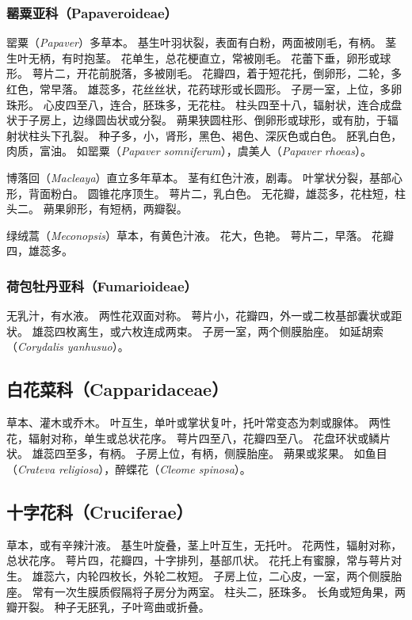 \documentclass[11pt]{article}
\begin{document}
\begin{sloppypar}
\subsubsection{罂粟亚科（Papaveroideae）}
罂粟（\textit{Papaver}）多草本。
基生叶羽状裂，表面有白粉，两面被刚毛，有柄。
茎生叶无柄，有时抱茎。
花单生，总花梗直立，常被刚毛。
花蕾下垂，卵形或球形。
萼片二，开花前脱落，多被刚毛。
花瓣四，着于短花托，倒卵形，二轮，多红色，常早落。
雄蕊多，花丝丝状，花药球形或长圆形。
子房一室，上位，多卵珠形。
心皮四至八，连合，胚珠多，无花柱。
柱头四至十八，辐射状，连合成盘状于子房上，边缘圆齿状或分裂。
蒴果狭圆柱形、倒卵形或球形，或有肋，于辐射状柱头下孔裂。
种子多，小，肾形，黑色、褐色、深灰色或白色。
胚乳白色，肉质，富油。
如罂粟（\textit{Papaver somniferum}），虞美人（\textit{Papaver rhoeas}）。

\par

博落回（\textit{Macleaya}）直立多年草本。
茎有红色汁液，剧毒。
叶掌状分裂，基部心形，背面粉白。
圆锥花序顶生。
萼片二，乳白色。
无花瓣，雄蕊多，花柱短，柱头二。
蒴果卵形，有短柄，两瓣裂。

\par

绿绒蒿（\textit{Meconopsis}）草本，有黄色汁液。
花大，色艳。
萼片二，早落。
花瓣四，雄蕊多。

\subsubsection{荷包牡丹亚科（Fumarioideae）}
无乳汁，有水液。
两性花双面对称。
萼片小，花瓣四，外一或二枚基部囊状或距状。
雄蕊四枚离生，或六枚连成两束。
子房一室，两个侧膜胎座。
如延胡索（\textit{Corydalis yanhusuo}）。

\subsection{白花菜科（Capparidaceae）}
草本、灌木或乔木。
叶互生，单叶或掌状复叶，托叶常变态为刺或腺体。
两性花，辐射对称，单生或总状花序。
萼片四至八，花瓣四至八。
花盘环状或鳞片状。
雄蕊四至多，有柄。
子房上位，有柄，侧膜胎座。
蒴果或浆果。
如鱼目（\textit{Crateva religiosa}），醉蝶花（\textit{Cleome spinosa}）。

\subsection{十字花科（Cruciferae）}
草本，或有辛辣汁液。
基生叶旋叠，茎上叶互生，无托叶。
花两性，辐射对称，总状花序。
萼片四，花瓣四，十字排列，基部爪状。
花托上有蜜腺，常与萼片对生。
雄蕊六，内轮四枚长，外轮二枚短。
子房上位，二心皮，一室，两个侧膜胎座。
常有一次生膜质假隔将子房分为两室。
柱头二，胚珠多。
长角或短角果，两瓣开裂。
种子无胚乳，子叶弯曲或折叠。


\end{sloppypar}
\end{document}
